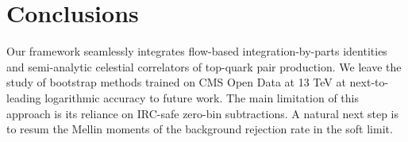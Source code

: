 \section{Conclusions}\label{sec:conclusions}

Our framework seamlessly integrates flow-based integration-by-parts
identities and semi-analytic celestial correlators of top-quark pair
production. We leave the study of bootstrap methods trained on CMS Open
Data at 13 TeV at next-to-leading logarithmic accuracy to future work.
The main limitation of this approach is its reliance on IRC-safe
zero-bin subtractions. A natural next step is to resum the Mellin
moments of the background rejection rate in the soft limit.


